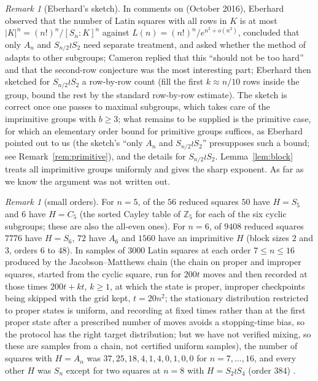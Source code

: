\documentclass[11pt]{amsart}
\theoremstyle{plain}
\theoremstyle{remark}
\newtheorem{remark}[theorem]{Remark}
\begin{document}
\begin{remark}[Eberhard's sketch]
In comments on \cite{Cam15} (October 2016), Eberhard observed that
the number of Latin squares with all rows in $K$ is at most
$|K|^n=(n!)^n/[S_n:K]^n$ against $L(n)=(n!)^n/e^{n^2+o(n^2)}$, concluded
that only $A_n$ and $S_{n/2}\wr S_2$ need separate treatment, and
asked whether the method of \cite{HJ96} adapts to other subgroups;
Cameron replied that this ``should not be too hard'' and that the
second-row conjecture was the most interesting part; Eberhard then
sketched for $S_{n/2}\wr S_2$ a row-by-row count (fill the first
$k\approx n/10$ rows inside the group, bound the rest by the standard
row-by-row estimate).
The sketch is correct once one passes to maximal subgroups, which
takes care of the imprimitive groups with $b\ge3$; what remains to be
supplied is the primitive case, for which an elementary order bound for
primitive groups suffices, as Eberhard pointed out to us (the sketch's
``only $A_n$ and $S_{n/2}\wr S_2$'' presupposes such a bound; see
Remark~\ref{rem:primitive}), and the details for $S_{n/2}\wr S_2$.  Lemma~\ref{lem:block} treats all imprimitive groups
uniformly and gives the sharp exponent.  As far as we know the argument
was not written out.
\end{remark}

\begin{remark}[small orders]\label{rem:small}
For $n=5$, of the $56$ reduced squares $50$ have $H=S_5$ and $6$ have
$H=C_5$ (the sorted Cayley table of $\mathbb Z_5$ for each of the six
cyclic subgroups; these are also the all-even ones).  For $n=6$, of
$9408$ reduced squares $7776$ have $H=S_6$, $72$ have $A_6$ and $1560$
have an imprimitive $H$ (block sizes $2$ and $3$, orders $6$ to $48$).
In samples of $3000$ Latin squares at each order $7\le n\le16$
produced by the Jacobson--Matthews chain \cite{JM96} (the chain on
proper and improper squares, started from the cyclic square, run for
$200t$ moves and then recorded at those times $200t+kt$, $k\ge1$, at
which the state is proper, improper checkpoints being skipped with the
grid kept, $t=20n^2$; the stationary distribution restricted to proper
states is uniform, and recording at fixed times rather than at the first
proper state after a prescribed number of moves avoids a stopping-time
bias, so the protocol has the right target distribution; but we have
not verified mixing, so these are samples from a chain, not certified
uniform samples), the number of squares with $H=A_n$ was
$37,25,18,4,1,4,0,1,0,0$ for $n=7,\dots,16$, and every other $H$ was
$S_n$ except for two squares at $n=8$ with $H=S_2\wr S_4$ (order
$384$) \cite{repo}.
\end{remark}
\end{document}
